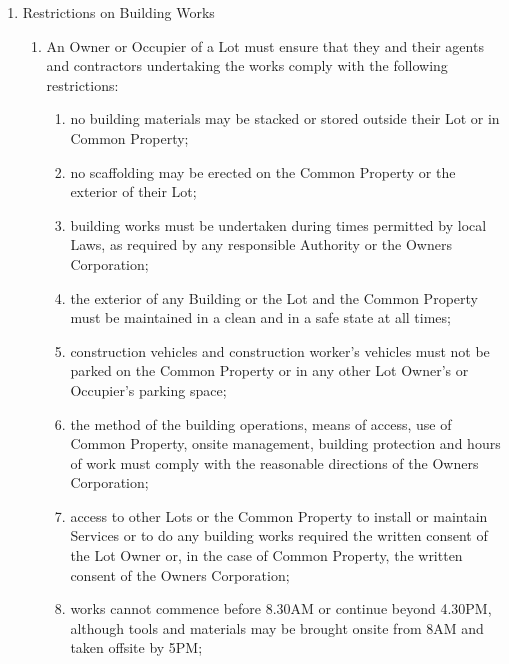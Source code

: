\documentclass{article}
\begin{document}
\begin{enumerate}[label=\arabic*.]
\begin{enumerate}[label=\arabic{enumi}.\arabic*.]
\begin{enumerate}[label=(\arabic*)]
\begin{enumerate}[label=(\alph*)]
\end{enumerate}

\end{enumerate}

\item  Restrictions on Building Works

\begin{enumerate}[label=(\arabic*)]

\item  An Owner or Occupier of a Lot must ensure that they and their agents and contractors undertaking the works comply with the following restrictions:

\begin{enumerate}[label=(\alph*)]

\item  no building materials may be stacked or stored outside their Lot or in Common Property;

\item  no scaffolding may be erected on the Common Property or the exterior of their Lot;

\item  building works must be undertaken during times permitted by local Laws, as required by any responsible Authority or the Owners Corporation;

\item  the exterior of any Building or the Lot and the Common Property must be maintained in a clean and in a safe state at all times;

\item  construction vehicles and construction worker’s vehicles must not be parked on the Common Property or in any other Lot Owner’s or Occupier’s parking space;

\item  the method of the building operations, means of access, use of Common Property, onsite management, building protection and hours of work must comply with the reasonable directions of the Owners Corporation;

\item  access to other Lots or the Common Property to install or maintain Services or to do any building works required the written consent of the Lot Owner or, in the case of Common Property, the written consent of the Owners Corporation;

\item  works cannot commence before 8.30AM or continue beyond 4.30PM, although tools and materials may be brought onsite from 8AM and taken offsite by 5PM;
\newpage




\end{enumerate}
\end{enumerate}
\end{enumerate}
\end{enumerate}
\end{document}
